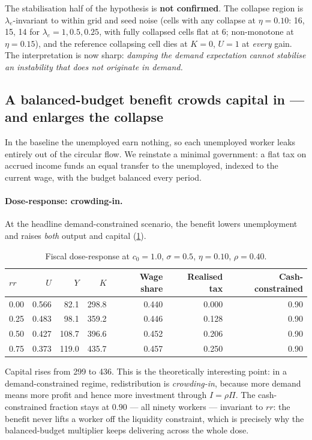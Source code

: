 The stabilisation half of the hypothesis is \textbf{not confirmed}. The
collapse region is $\lambda_e$-invariant to within grid and seed noise (cells
with any collapse at $\eta = 0.10$: 16, 15, 14 for $\lambda_e = 1, 0.5, 0.25$,
with fully collapsed cells flat at 6; non-monotone at $\eta = 0.15$), and the
reference collapsing cell dies at $K = 0$, $U = 1$ at \emph{every} gain. The
interpretation is now sharp: \emph{damping the demand expectation cannot
stabilise an instability that does not originate in demand.}

\subsection{A balanced-budget benefit crowds capital in --- and enlarges the
collapse}
\label{sec:government}

In the baseline the unemployed earn nothing, so each unemployed worker leaks
entirely out of the circular flow. We reinstate a minimal government: a flat
tax on accrued income funds an equal transfer to the unemployed, indexed to
the current wage, with the budget balanced every period.

\paragraph{Dose-response: crowding-in.} At the headline demand-constrained
scenario, the benefit lowers unemployment and raises \emph{both} output and
capital (\cref{tab:government}).

\begin{table}[htbp]
\centering
\small
\caption{Fiscal dose-response at $c_0 = 1.0$, $\sigma = 0.5$, $\eta = 0.10$,
$\rho = 0.40$.}
\label{tab:government}
\begin{tabular}{lrrrrrr}
\toprule
$rr$ & $U$ & $Y$ & $K$ & Wage share & Realised tax & Cash-constrained\\
\midrule
0.00 & 0.566 & 82.1 & 298.8 & 0.440 & 0.000 & 0.90\\
0.25 & 0.483 & 98.1 & 359.2 & 0.446 & 0.128 & 0.90\\
0.50 & 0.427 & 108.7 & 396.6 & 0.452 & 0.206 & 0.90\\
0.75 & 0.373 & 119.0 & 435.7 & 0.457 & 0.250 & 0.90\\
\bottomrule
\end{tabular}
\end{table}

Capital rises from 299 to 436. This is the theoretically interesting point: in
a demand-constrained regime, redistribution is \emph{crowding-in}, because
more demand means more profit and hence more investment through $I = \rho\Pi$.
The cash-constrained fraction stays at $0.90$ --- all ninety workers ---
invariant to $rr$: the benefit never lifts a worker off the liquidity
constraint, which is precisely why the balanced-budget multiplier keeps
delivering across the whole dose.

